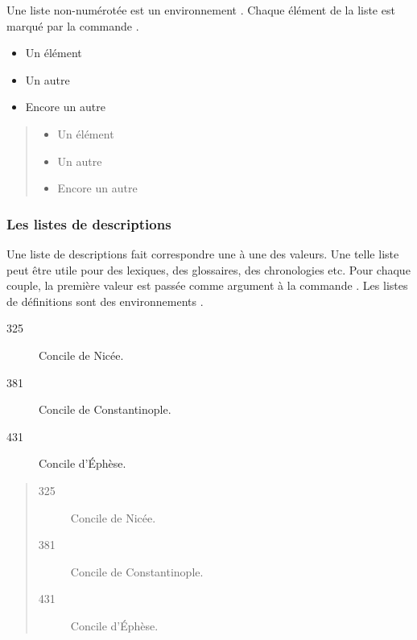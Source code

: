 Une liste non-numérotée est un environnement .
Chaque élément de la liste est marqué par la commande .

\begin{latexcode}
\begin{itemize}
    \item Un élément
    \item Un autre
    \item Encore un autre
\end{itemize}
\end{latexcode}

\begin{quotation}
\noindent\begin{itemize}
    \item Un élément
    \item Un autre
    \item Encore un autre
\end{itemize}
\end{quotation}

\subsubsection{Les listes de descriptions}

Une liste de descriptions fait correspondre une à une des valeurs. Une telle liste peut être utile pour des lexiques, des glossaires, des chronologies etc. Pour chaque couple, la première valeur est passée comme argument à la commande . Les listes de définitions sont des environnements .


\begin{latexcode}
\begin{description}
    \item[325]Concile de Nicée.
    \item[381]Concile de Constantinople.
    \item[431]Concile d'Éphèse.
\end{description}
\end{latexcode}

\begin{quotation}
\noindent\begin{description}
    \item[325]Concile de Nicée.
    \item[381]Concile de Constantinople.
    \item[431]Concile d'Éphèse.
\end{description}
\end{quotation}

